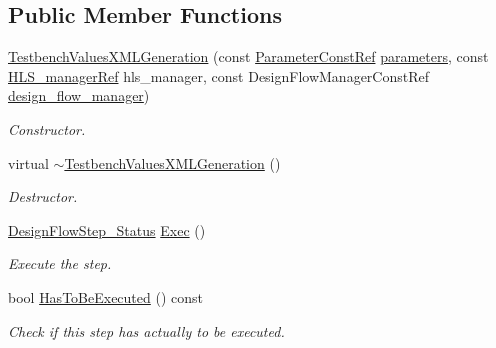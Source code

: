 \subsection*{Public Member Functions}
\begin{DoxyCompactItemize}
\item 
\hyperlink{classTestbenchValuesXMLGeneration_a47d557a2a6cc2411acd6bfdf440ceb78}{Testbench\+Values\+X\+M\+L\+Generation} (const \hyperlink{Parameter_8hpp_a37841774a6fcb479b597fdf8955eb4ea}{Parameter\+Const\+Ref} \hyperlink{classDesignFlowStep_a802eaafe8013df706370679d1a436949}{parameters}, const \hyperlink{hls__manager_8hpp_acd3842b8589fe52c08fc0b2fcc813bfe}{H\+L\+S\+\_\+manager\+Ref} hls\+\_\+manager, const Design\+Flow\+Manager\+Const\+Ref \hyperlink{classDesignFlowStep_ab770677ddf087613add30024e16a5554}{design\+\_\+flow\+\_\+manager})
\begin{DoxyCompactList}\small\item\em Constructor. \end{DoxyCompactList}\item 
virtual \hyperlink{classTestbenchValuesXMLGeneration_a24496274861eb4c03d4da3b9a9af1956}{$\sim$\+Testbench\+Values\+X\+M\+L\+Generation} ()
\begin{DoxyCompactList}\small\item\em Destructor. \end{DoxyCompactList}\item 
\hyperlink{design__flow__step_8hpp_afb1f0d73069c26076b8d31dbc8ebecdf}{Design\+Flow\+Step\+\_\+\+Status} \hyperlink{classTestbenchValuesXMLGeneration_afbcc1f49fabb5fa9cf4c4aaa15acba75}{Exec} ()
\begin{DoxyCompactList}\small\item\em Execute the step. \end{DoxyCompactList}\item 
bool \hyperlink{classTestbenchValuesXMLGeneration_ad4f4aed7d1ff36657d084de85e3ee717}{Has\+To\+Be\+Executed} () const
\begin{DoxyCompactList}\small\item\em Check if this step has actually to be executed. \end{DoxyCompactList}\end{DoxyCompactItemize}
